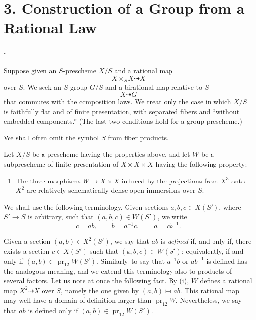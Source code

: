\section*{3. Construction of a
Group from a Rational Law}

\paragraph{.}
Suppose given an \(S\)-prescheme \(X/S\) and a rational map
\[
  X\times_S X\dashrightarrow X
\]
over \(S\). We seek an \(S\)-group \(G/S\) and a birational map
relative to \(S\)
\[
  X\dashrightarrow G
\]
that commutes with the composition laws. We treat only the case in
which \(X/S\) is faithfully flat and of finite presentation, with
separated fibers and ``without embedded components.'' (The last two
conditions hold for a group prescheme.)

We shall often omit the symbol \(S\) from fiber products.

Let \(X/S\) be a prescheme having the properties
above, and let \(W\) be a subprescheme
of finite presentation of \(X\times X\times X\) having the
following property:
\begin{enumerate}
\item[\SGAInlineRefTarget{sga3:xviii:def:3.1:item:i}(i)] The three morphisms \(W\to X\times X\) induced by the
  projections from \(X^3\) onto \(X^2\) are relatively schematically
  dense open immersions over \(S\).
\end{enumerate}

We shall use the following terminology. Given sections
\(a,b,c\in X(S')\), where \(S'\to S\) is arbitrary, such that
\((a,b,c)\in W(S')\), we write
\[
  c=ab,\qquad b=a^{-1}c,\qquad a=cb^{-1}.
\]

%
Given a section \((a,b)\in X^2(S')\), we say that \(ab\) is
\emph{defined} if, and only if, there exists a section
\(c\in X(S')\) such that \((a,b,c)\in W(S')\); equivalently, if and
only if \((a,b)\in\operatorname{pr}_{12}W(S')\). Similarly, to say
that \(a^{-1}b\) or \(ab^{-1}\) is defined has the analogous
meaning, and we extend this terminology also to products of several
factors. Let us note at once the following fact. By \textup{(i)}, \(W\)
defines a rational map \(X^2\dashrightarrow X\) over \(S\), namely
the one given by \((a,b)\mapsto ab\). This rational map may well
have a domain of definition larger than
\(\operatorname{pr}_{12}W\). Nevertheless, we say that \(ab\) is
defined only if \((a,b)\in\operatorname{pr}_{12}W(S')\).

